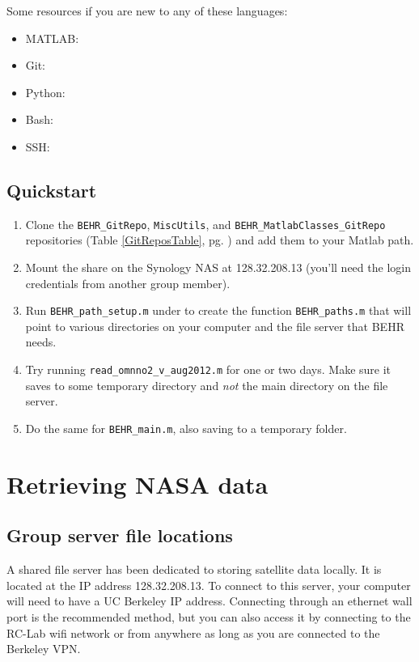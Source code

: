 \documentclass[12pt]{article}
\begin{document}
	Some resources if you are new to any of these languages:
	\begin{itemize}
		\item MATLAB:
		\item Git:
		\item Python:
		\item Bash:
		\item SSH:
	\end{itemize}
	
	\subsection{Quickstart}
	\begin{enumerate}
	\item Clone the \lstinline$BEHR_GitRepo$, \lstinline$MiscUtils$, and \lstinline$BEHR_MatlabClasses_GitRepo$ repositories (Table \ref{GitReposTable}, pg. \pageref{GitReposTable}) and add them to your Matlab path.
	\item Mount the  share on the Synology NAS at 128.32.208.13 (you'll need the login credentials from another group member).
	\item Run \lstinline$BEHR_path_setup.m$ under  to create the function \lstinline$BEHR_paths.m$ that will point to various directories on your computer and the file server that BEHR needs.
	\item Try running \lstinline$read_omnno2_v_aug2012.m$ for one or two days. Make sure it saves to some temporary directory and \emph{not} the main  directory on the file server.
	\item Do the same for \lstinline$BEHR_main.m$, also saving to a temporary folder.
	\end{enumerate}

\section{Retrieving NASA data}
	\subsection{Group server file locations}\label{sec:file-server}
		A shared file server has been dedicated to storing satellite data locally. It is located at the IP address 128.32.208.13. To connect to this server, your computer will need to have a UC Berkeley IP address.  Connecting through an ethernet wall port is the recommended method, but you can also access it by connecting to the RC-Lab wifi network or from anywhere as long as you are connected to the Berkeley VPN.  
		
\end{document}
